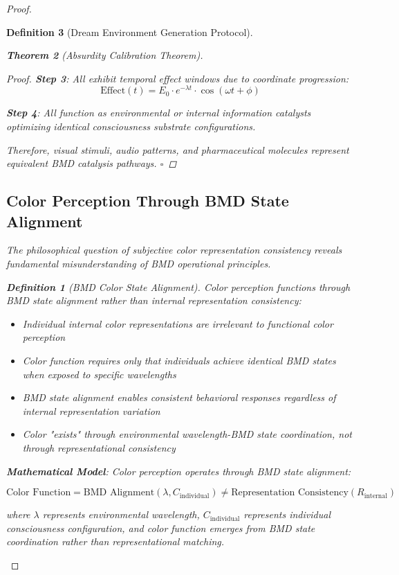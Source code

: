\documentclass[12pt,a4paper]{article}
\newtheorem{theorem}{Theorem}[section]
\newtheorem{definition}[theorem]{Definition}
\begin{document}
\begin{proof}
\begin{definition}[Dream Environment Generation Protocol]
\begin{theorem}[Absurdity Calibration Theorem]
\begin{proof}
\textbf{Step 3}: All exhibit temporal effect windows due to coordinate progression:
$$\text{Effect}(t) = E_0 \cdot e^{-\lambda t} \cdot \cos(\omega t + \phi)$$

\textbf{Step 4}: All function as environmental or internal information catalysts optimizing identical consciousness substrate configurations.

Therefore, visual stimuli, audio patterns, and pharmaceutical molecules represent equivalent BMD catalysis pathways. $\square$
\end{proof}

\subsection{Color Perception Through BMD State Alignment}

The philosophical question of subjective color representation consistency reveals fundamental misunderstanding of BMD operational principles.

\begin{definition}[BMD Color State Alignment]
Color perception functions through BMD state alignment rather than internal representation consistency:
\begin{itemize}
\item Individual internal color representations are irrelevant to functional color perception
\item Color function requires only that individuals achieve identical BMD states when exposed to specific wavelengths
\item BMD state alignment enables consistent behavioral responses regardless of internal representation variation
\item Color "exists" through environmental wavelength-BMD state coordination, not through representational consistency
\end{itemize}
\end{definition}

\textbf{Mathematical Model}:
Color perception operates through BMD state alignment:

$$\text{Color Function} = \text{BMD Alignment}(\lambda, C_{\text{individual}}) \neq \text{Representation Consistency}(R_{\text{internal}})$$

where $\lambda$ represents environmental wavelength, $C_{\text{individual}}$ represents individual consciousness configuration, and color function emerges from BMD state coordination rather than representational matching.


\end{theorem}
\end{definition}
\end{proof}
\end{document}
